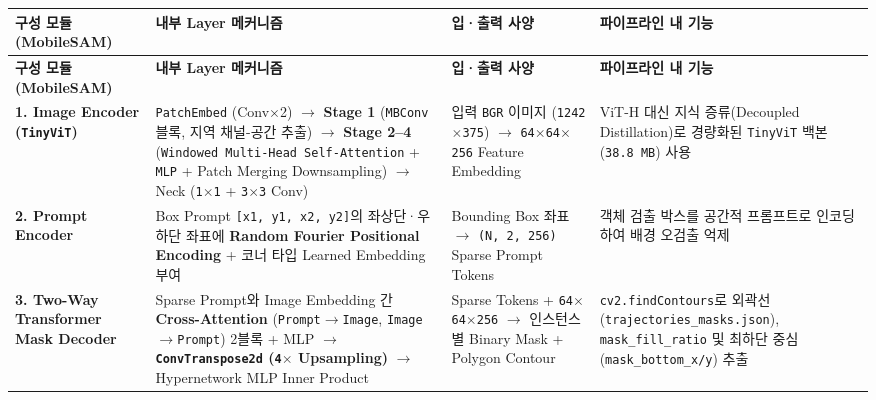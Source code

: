 \documentclass[10.5pt,a4paper]{article}
\begin{document}
\begin{footnotesize}
\setlength{\tabcolsep}{4pt}
\setlength{\LTleft}{0pt}\setlength{\LTright}{0pt}
\begin{longtable}{>{\raggedright\arraybackslash}p{} >{\raggedright\arraybackslash}p{} >{\raggedright\arraybackslash}p{} >{\raggedright\arraybackslash}p{}}
\toprule
\textbf{구성 모듈 (MobileSAM)} & \textbf{내부 Layer 메커니즘} & \textbf{입·출력 사양} & \textbf{파이프라인 내 기능} \\
\midrule
\endfirsthead
\toprule
\textbf{구성 모듈 (MobileSAM)} & \textbf{내부 Layer 메커니즘} & \textbf{입·출력 사양} & \textbf{파이프라인 내 기능} \\
\midrule
\endhead
\bottomrule
\endfoot
\textbf{1. Image Encoder (\texttt{TinyViT})} & \texttt{PatchEmbed} (Conv$\times$2) $\rightarrow$ \textbf{Stage 1} (\texttt{MBConv} 블록, 지역 채널-공간 추출) $\rightarrow$ \textbf{Stage 2--4} (\texttt{Windowed Multi-\allowbreak{}Head Self-\allowbreak{}Attention} + \texttt{MLP} + Patch Merging Downsampling) $\rightarrow$ Neck (\texttt{1$\times$1} + \texttt{3$\times$3} Conv) & 입력 \texttt{BGR} 이미지 (\texttt{1242$\times$375}) $\rightarrow$ \texttt{64$\times$64$\times$256} Feature Embedding & ViT-H 대신 지식 증류(Decoupled Distillation)로 경량화된 \texttt{TinyViT} 백본(\texttt{38.\allowbreak{}8 MB}) 사용 \\
\textbf{2. Prompt Encoder} & Box Prompt \texttt{[x1,\allowbreak{} y1,\allowbreak{} x2,\allowbreak{} y2]}의 좌상단·우하단 좌표에 \textbf{Random Fourier Positional Encoding} + 코너 타입 Learned Embedding 부여 & Bounding Box 좌표 $\rightarrow$ \texttt{(N,\allowbreak{} 2,\allowbreak{} 256)} Sparse Prompt Tokens & 객체 검출 박스를 공간적 프롬프트로 인코딩하여 배경 오검출 억제 \\
\textbf{3. Two-Way Transformer Mask Decoder} & Sparse Prompt와 Image Embedding 간 \textbf{Cross-Attention} (\texttt{Prompt$\rightarrow$Image}, \texttt{Image$\rightarrow$Prompt}) 2블록 + MLP $\rightarrow$ \textbf{\texttt{ConvTranspose2d} (\texttt{4$\times$} Upsampling)} $\rightarrow$ Hypernetwork MLP Inner Product & Sparse Tokens + \texttt{64$\times$64$\times$256} $\rightarrow$ 인스턴스별 Binary Mask + Polygon Contour & \texttt{cv2.\allowbreak{}findContours}로 외곽선(\texttt{trajectories\_\allowbreak{}masks.\allowbreak{}json}), \texttt{mask\_\allowbreak{}fill\_\allowbreak{}ratio} 및 최하단 중심(\texttt{mask\_\allowbreak{}bottom\_\allowbreak{}x/\allowbreak{}y}) 추출 \\
\end{longtable}
\end{footnotesize}
\end{document}
